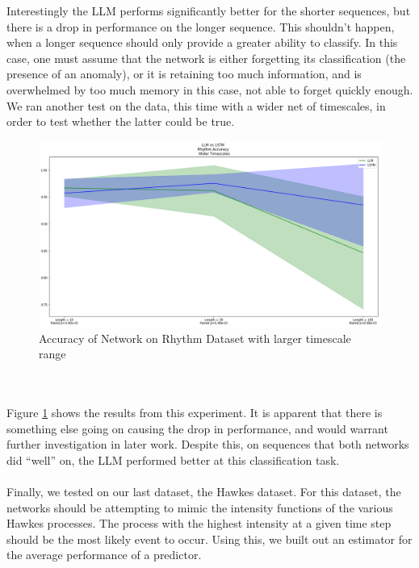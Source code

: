 Interestingly the LLM performs significantly better for the shorter sequences, but there is a drop in performance on the longer sequence. This shouldn't happen, when a longer sequence should only provide a greater ability to classify. In this case, one must assume that the network is either forgetting its classification (the presence of an anomaly), or it is retaining too much information, and is overwhelmed by too much memory in this case, not able to forget quickly enough. We ran another test on the data, this time with a wider net of timescales, in order to test whether the latter could be true.
\begin{figure}
    \centering
    \includegraphics[width=1.0\textwidth]{figures/Rhythm_Wide_Accuracy.png}
    \caption{Accuracy of Network on Rhythm Dataset with larger timescale range}
    \label{fig:RhyWide}
\end{figure}
\textit{ }\\\\Figure \ref{fig:RhyWide} shows the results from this experiment. It is apparent that there is something else going on causing the drop in performance, and would warrant further investigation in later work. Despite this, on sequences that both networks did ``well'' on, the LLM performed better at this classification task. 
\\\\ Finally, we tested on our last dataset, the Hawkes dataset. For this dataset, the networks should be attempting to mimic the intensity functions of the various Hawkes processes. The process with the highest intensity at a given time step should be the most likely event to occur. Using this, we built out an estimator for the average performance of a predictor.
